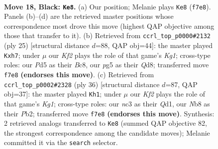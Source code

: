 \documentclass[11pt]{article}
\begin{document}
\clearpage

\begin{figure}[p]\centering
\begin{subfigure}{0.46\textwidth}\centering
\resizebox{\linewidth}{!}{%
\newchessgame
\chessboard[
  setfen={rnbq1r2/p3bk1Q/1p4p1/2np2P1/P7/2N2N2/1P3P2/R1B1KB1R b KQ - 3 18},
  showmover=false,
  pgfstyle=straightmove, color=movearrow, markmove={f7-e8}
]}
\caption{}
\end{subfigure}\hfill
\begin{subfigure}{0.46\textwidth}\centering
\resizebox{\linewidth}{!}{%
\newchessgame
\chessboard[
  setfen={r1bq1rk1/pp1nbppB/4p3/P3N3/3n4/2N5/1P3PPP/R1BQ1RK1 b - - 0 13},
  showmover=false,
  pgfstyle=straightmove, color=movearrow, markmove={g8-h7}
]}
\caption{}
\end{subfigure}
\\[4pt]
\begin{subfigure}{0.46\textwidth}\centering
\resizebox{\linewidth}{!}{%
\newchessgame
\chessboard[
  setfen={b4rk1/5p2/1q1p1bpp/1N2n3/4P3/1N6/1PP1B1PP/3Q1RK1 w - - 1 19},
  showmover=false,
  pgfstyle=straightmove, color=movearrow, markmove={g1-h1}
]}
\caption{}
\end{subfigure}\hfill

\caption{\textbf{Move 18, Black: \texttt{Ke8}.} (a) Our position; Melanie plays \texttt{Ke8} (\texttt{f7e8}). Panels (b)--(d) are the retrieved master positions whose correspondence most drove this move (highest QAP objective among those that transfer to it). (b) Retrieved from \texttt{ccrl\_top\_p0000\#2132} (ply 25) [structural distance $d$=88, QAP obj=44]: the master played \texttt{Kxh7}; under $\mu$ our \emph{Kf2} plays the role of that game's \emph{Kg1}; cross-type roles: our \emph{P}d5 as their \emph{B}c8, our \emph{p}g5 as their \emph{Q}d8; transferred move \texttt{f7e8} \textbf{(endorses this move)}. (c) Retrieved from \texttt{ccrl\_top\_p0002\#2328} (ply 36) [structural distance $d$=87, QAP obj=37]: the master played \texttt{Kh1}; under $\mu$ our \emph{Kf2} plays the role of that game's \emph{Kg1}; cross-type roles: our \emph{n}c3 as their \emph{Q}d1, our \emph{N}b8 as their \emph{P}b2; transferred move \texttt{f7e8} \textbf{(endorses this move)}. Synthesis: 2 retrieved analogs transferred to \texttt{Ke8} (summed QAP objective 82, the strongest correspondence among the candidate moves); Melanie committed it via the \texttt{search} selector.}
\label{fig:thought-m35}
\end{figure}

\clearpage
\end{document}
